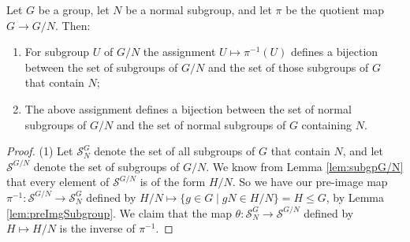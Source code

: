 \begin{theorem}
    Let $G$ be a group, let $N$ be a normal subgroup, and let $\pi$ be the quotient map $G \rightarrow G / N$. Then:
    \begin{enumerate}
        \item For subgroup $U$ of $G/N$ the assignment $U \mapsto \pi^{-1}(U)$ defines a bijection between the set of subgroups of $G / N$ and the set of those subgroups of $G$ that contain $N$;
        \item The above assignment defines a bijection between the set of normal subgroups of $G / N$ and the set of normal subgroups of $G$ containing $N$.
    \end{enumerate}
\end{theorem}


\begin{proof}




(1) Let \( \mathcal{S}^{G}_N \) denote the set of all subgroups of \( G \) that contain \( N \), and let \( \mathcal{S}^{G/N} \) denote the set of subgroups of \( G/N \). We know from Lemma \ref{lem:subgpG/N} that every element of \( \mathcal{S}^{G/N} \) is of the form \( H/N \). So we have our pre-image map \( \pi^{-1}: \mathcal{S}^{G/N} \rightarrow \mathcal{S}^{G}_N \) defined by \( H/N \mapsto \{g \in G \mid gN \in H/N\} = H \leq G \), by Lemma \ref{lem:preImgSubgroup}. We claim that the map \( \theta: \mathcal{S}^{G}_N \rightarrow \mathcal{S}^{G/N} \) defined by \( H \mapsto H/N \) is the inverse of \( \pi^{-1} \).


\end{proof}
